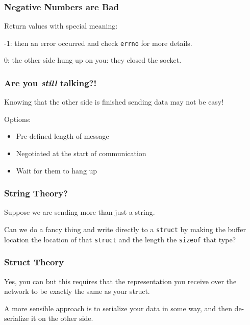 \begin{frame}
\frametitle{Negative Numbers are Bad}

Return values with special meaning:

-1:  then an error occurred and check \texttt{errno} for more details. 

0: the other side hung up on you: they closed the socket. 
\end{frame}

\begin{frame}
\frametitle{Are you \textit{still} talking?!}

Knowing that the other side is finished sending data may not be easy!

Options:

\begin{itemize}
	\item Pre-defined length of message
	\item Negotiated at the start of communication
	\item Wait for them to hang up
\end{itemize}

\end{frame}



\begin{frame}
\frametitle{String Theory?}
Suppose we are sending more than just a string. 

Can we do a fancy thing and write directly to a \texttt{struct} by making the buffer location the location of that \texttt{struct} and the length the \texttt{sizeof} that type? 

\end{frame}



\begin{frame}
\frametitle{Struct Theory}

Yes, you can but this requires that the representation you receive over the network to be exactly the same as your struct. 

A more sensible approach is to serialize your data in some way, and then de-serialize it on the other side. 

\end{frame}



